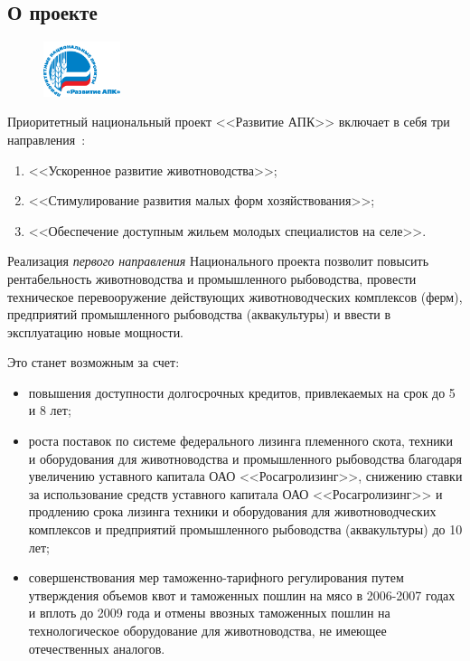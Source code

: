 \documentclass[article, 12pt, russian, oneside]{ncc}
\begin{document}
\subsection{О проекте}

\begin{figure}
  \begin{center}
    \includegraphics[width=0.2\textwidth]{NPR_APK}
  \end{center}
\end{figure}

Приоритетный национальный проект <<Развитие АПК>> включает в себя три
направления~\cite{APK_Problems}:

\begin{enumerate}
\item <<Ускоренное развитие животноводства>>;
\item <<Стимулирование развития малых форм хозяйствования>>;
\item <<Обеспечение доступным жильем молодых специалистов на селе>>.
\end{enumerate}

Реализация \emph{первого направления} Национального проекта позволит
повысить рентабельность животноводства и промышленного рыбоводства,
провести техническое перевооружение действующих животноводческих
комплексов (ферм), предприятий промышленного рыбоводства
(аквакультуры) и ввести в эксплуатацию новые мощности.

Это станет возможным за счет:

\begin{itemize}
\item повышения доступности долгосрочных кредитов, привлекаемых на
  срок до 5 и 8 лет;
\item роста поставок по системе федерального лизинга племенного скота,
  техники и оборудования для животноводства и промышленного
  рыбоводства благодаря увеличению уставного капитала ОАО
  <<Росагролизинг>>, снижению ставки за использование средств
  уставного капитала ОАО <<Росагролизинг>> и продлению срока лизинга
  техники и оборудования для животноводческих комплексов и предприятий
  промышленного рыбоводства (аквакультуры) до 10 лет;
\item совершенствования мер таможенно-тарифного регулирования путем \linebreak
  утверждения объемов квот и таможенных пошлин на мясо в 2006-2007
  годах и вплоть до 2009 года и отмены ввозных таможенных пошлин на
  технологическое оборудование для животноводства, не имеющее
  отечественных аналогов.
\end{itemize}
\end{document}
